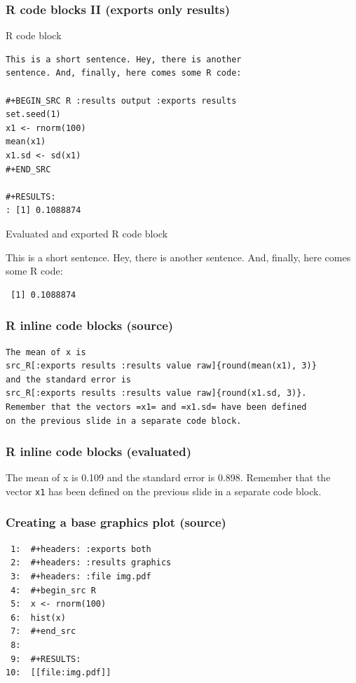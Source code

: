 \documentclass[bigger]{beamer}
\begin{document}
\begin{frame}[fragile,t, shrink = 15]
\frametitle{R code blocks II (exports only results)}
\label{sec-3-1-3}
\begin{block}{R code block}
\label{sec-3-1-3-1}


\begin{verbatim}
This is a short sentence. Hey, there is another 
sentence. And, finally, here comes some R code:

#+BEGIN_SRC R :results output :exports results
set.seed(1)
x1 <- rnorm(100) 
mean(x1) 
x1.sd <- sd(x1) 
#+END_SRC

#+RESULTS:
: [1] 0.1088874
\end{verbatim}
\end{block}
\begin{block}{Evaluated and exported R code block}
\label{sec-3-1-3-2}


This is a short sentence.  Hey, there is another sentence. And, finally, here comes some R code:



\begin{verbatim}
 [1] 0.1088874
\end{verbatim}
\end{block}
\end{frame}
\begin{frame}[fragile]
\frametitle{R inline code blocks (source)}
\label{sec-3-1-4}


\begin{footnotesize}

\begin{verbatim}
The mean of x is 
src_R[:exports results :results value raw]{round(mean(x1), 3)}
and the standard error is 
src_R[:exports results :results value raw]{round(x1.sd, 3)}. 
Remember that the vectors =x1= and =x1.sd= have been defined 
on the previous slide in a separate code block.
\end{verbatim}
\end{footnotesize}
\end{frame}
\begin{frame}
\frametitle{R inline code blocks (evaluated)}
\label{sec-3-1-5}


The mean of x is 0.109
and the standard error is 
0.898. Remember that the
vector \texttt{x1} has been defined on the previous slide in a separate code block.
\end{frame}
\begin{frame}[fragile]
\frametitle{Creating a base graphics plot (source)}
\label{sec-3-1-6}



\begin{verbatim}
 1:  #+headers: :exports both 
 2:  #+headers: :results graphics
 3:  #+headers: :file img.pdf
 4:  #+begin_src R 
 5:  x <- rnorm(100)
 6:  hist(x)
 7:  #+end_src 
 8:  
 9:  #+RESULTS:
10:  [[file:img.pdf]]
\end{verbatim}
\end{frame}
\end{document}
